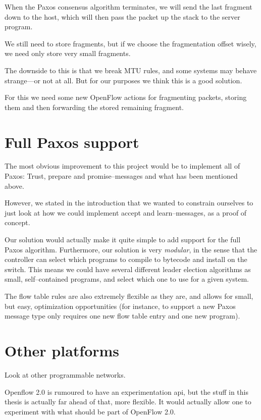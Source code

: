 When the Paxos consensus algorithm terminates, we will send the last
fragment down to the host, which will then pass the packet up the stack to
the server program.

We still need to store fragments, but if we choose the fragmentation offset
wisely, we need only store very small fragments.

The downside to this is that we break MTU rules, and some systems may behave
strange---or not at all.  But for our purposes we think this is a good
solution.

For this we need some new OpenFlow actions for fragmenting packets, storing
them and then forwarding the stored remaining fragment.

\section{Full Paxos support}

The most obvious improvement to this project would be to implement all of
Paxos: Trust, prepare and promise--messages and what has been mentioned
above.

However, we stated in the introduction that we wanted to constrain ourselves
to just look at how we could implement accept and learn--messages, as a
proof of concept.

Our solution would actually make it quite simple to add support for the full
Paxos algorithm.  Furthermore, our solution is very \textit{modular}, in the
sense that the controller can select which programs to compile to bytecode
and install on the switch.  This means we could have several different
leader election algorithms as small, self--contained programs, and select
which one to use for a given system.

The flow table rules are also extremely flexible as they are, and allows for
small, but easy, optimization opportunities (for instance, to support a new
Paxos message type only requires one new flow table entry and one new
program).


\section{Other platforms}

Look at other programmable networks.

Openflow 2.0 is rumoured to have an experimentation api, but the stuff in
this thesis is actually far ahead of that, more flexible.
It would actually allow one to experiment with what should be part of
OpenFlow 2.0.
